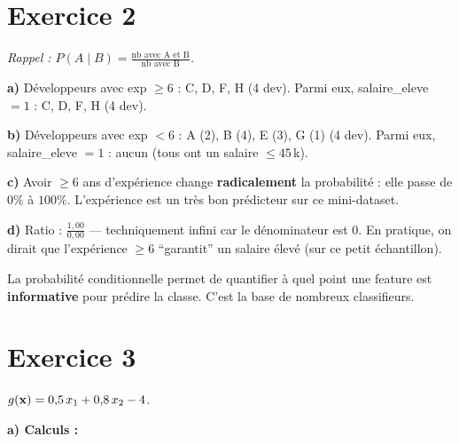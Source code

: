 \section*{Exercice 2 \hfill \exofondamental}
\textit{Rappel : $P(A \mid B) = \frac{\text{nb avec A et B}}{\text{nb avec B}}$.}

\separateur

\textbf{a)} D\'{e}veloppeurs avec exp $\geq 6$ : C, D, F, H (4 dev).
Parmi eux, salaire\_eleve $= 1$ : C, D, F, H (4 dev).

\textbf{b)} D\'{e}veloppeurs avec exp $< 6$ : A (2), B (4), E (3), G (1) (4 dev).
Parmi eux, salaire\_eleve $= 1$ : aucun (tous ont un salaire $\leq 45$\,k\texteuro).

\textbf{c)} Avoir $\geq 6$ ans d'exp\'{e}rience change \textbf{radicalement} la probabilit\'{e} :
elle passe de $0\%$ \`{a} $100\%$. L'exp\'{e}rience est un tr\`{e}s bon pr\'{e}dicteur sur ce mini-dataset.

\textbf{d)} Ratio : $\frac{1{,}00}{0{,}00}$ --- techniquement infini car le d\'{e}nominateur est 0.
En pratique, on dirait que l'exp\'{e}rience $\geq 6$ ``garantit'' un salaire \'{e}lev\'{e}
(sur ce petit \'{e}chantillon).

\begin{retenirbox}
    La probabilit\'{e} conditionnelle permet de quantifier \`{a} quel point une feature
    est \textbf{informative} pour pr\'{e}dire la classe. C'est la base de nombreux classifieurs.
\end{retenirbox}

\section*{Exercice 3 \hfill \exofondamental}
\textit{$g(\mathbf{x}) = 0{,}5\,x_1 + 0{,}8\,x_2 - 4$.}

\separateur

\textbf{a) Calculs :}

